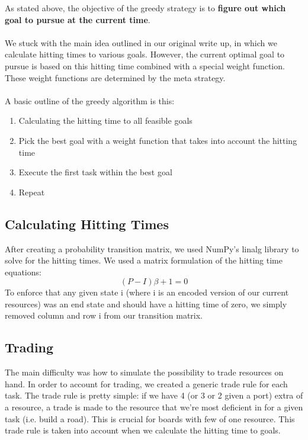 \documentclass{article}
\begin{document}
As stated above, the objective of the greedy strategy is to \textbf{figure out which goal to pursue at the current time}. \\ \\
We stuck with the main idea outlined in our original write up, in which we calculate hitting times to various goals. However, the current optimal goal to pursue is based on this hitting time combined with a special weight function. These weight functions are determined by the meta strategy.  \\ \\
A basic outline of the greedy algorithm is this:
\begin{enumerate}
    \item Calculating the hitting time to all feasible goals 
    \item Pick the best goal with a weight function that takes into account the hitting time
    \item Execute the first task within the best goal
    \item Repeat
\end{enumerate}

\subsection*{Calculating Hitting Times}

After creating a probability transition matrix, we used NumPy’s linalg library to solve for the hitting times. We used a matrix formulation of the hitting time equations: 
$$
(P - I)\beta + 1 = 0
$$ 
To enforce that any given state i (where i is an encoded version of our current resources) was an end state and should have a hitting time of zero, we simply removed column and row i from our transition matrix. 

\subsection*{Trading}

The main difficulty was how to simulate the possibility to trade resources on hand. In order to account for trading, we created a generic trade rule for each task. The trade rule is pretty simple: if we have 4 (or 3 or 2 given a port) extra of a resource, a trade is made to the resource that we’re most deficient in for a given task (i.e. build a road). This is crucial for boards with few of one resource. This trade rule is taken into account when we calculate the hitting time to goals.
\end{document}
